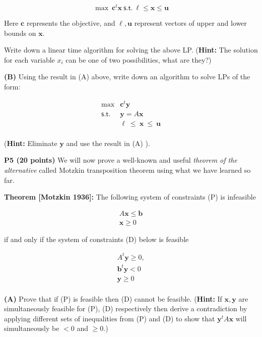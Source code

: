 \documentclass[11pt]{article}
\newcommand\vx {\mathbf{x}}
\newcommand\vy {\mathbf{y}}
\begin{document}
\[ \max\ \mathbf{c}^t \mathbf{x}\ \mathsf{s.t.}\ \ell \leq \mathbf{x}
\leq \mathbf{u} \]

Here $\mathbf{c}$ represents the objective, and $\ell, \mathbf{u}$
represent vectors of upper and lower bounds on $\mathbf{x}$. 

Write down a linear time algorithm for solving the above LP.
(\textbf{Hint:} The solution for each variable $x_i$ can be one of two
possibilities, what are they?)

\medskip

\noindent\textbf{(B)} Using the result in (A) above, write down an
algorithm to solve LPs of the form:

\[ \begin{array}{rl}
\max & \mathbf{c}^t \mathbf{y} \\
\mathsf{s.t.} & \mathbf{y} = A \mathbf{x} \\
& \mathbf{\ell}\ \leq\ \mathbf{x}\ \leq\ \mathbf{u} \\
\end{array}\]

(\textbf{Hint:} Eliminate $\mathbf{y}$ and use the result in (A) ).

\noindent\textbf{P5 (20 points)} We will now prove a well-known
and useful \emph{theorem of the alternative} called Motzkin
transposition theorem using what we have learned so far.

\begin{framed}
\noindent\textbf{Theorem [Motzkin 1936]:} The following system of constraints \textsf{(P)} is infeasible

\[ \begin{array}{l}
A \mathbf{x} \leq \mathbf{b}\\
 \mathbf{x} \geq 0 
\end{array}\]

 if and only if the system of constraints \textsf{(D)}  below is feasible

\[ \begin{array}{l}
A^t \mathbf{y} \geq 0,\\
\mathbf{b}^t \mathbf{y} < 0\\
\mathbf{y} \geq 0 \\
\end{array}\]
\end{framed}

\noindent\textbf{(A)} Prove that if \textsf{(P)} is feasible then
\textsf{(D)} cannot be feasible. (\textbf{Hint:} If $\vx, \vy$ are
simultaneously feasible for \textsf{(P)}, \textsf{(D)} respectively
then derive a contradiction by applying different sets of inequalities
from \textsf{(P)} and \textsf{(D)} to show that $\mathbf{y}^t A \mathbf{x}$ will simultaneously be
$< 0$ and $ \geq 0$.) 
\end{document}
